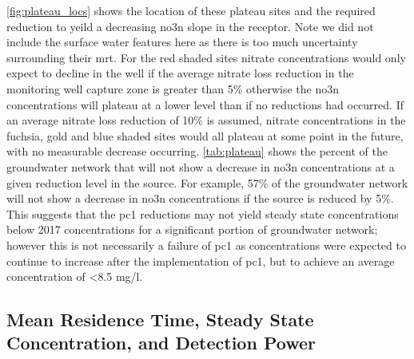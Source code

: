 \autoref{fig:plateau_locs} shows the location of these plateau sites and the required reduction to yeild a decreasing \gls{no3n} slope in the receptor.
Note we did not include the surface water features here as there is too much uncertainty surrounding their \gls{mrt}.
For the red shaded sites nitrate concentrations would only expect to decline in the well if the average nitrate loss reduction in the monitoring well capture zone is greater than 5\% otherwise the \gls{no3n} concentrations will plateau at a lower level than if no reductions had occurred.
If an average nitrate loss reduction of 10\% is assumed, nitrate concentrations in the fuchsia, gold and blue shaded sites would all plateau at some point in the future, with no measurable decrease occurring.
\autoref{tab:plateau} shows the percent of the groundwater network that will not show a decrease in \gls{no3n} concentrations at a given reduction level in the source.
For example, 57\% of the groundwater network will not show a decrease in \gls{no3n} concentrations if the source is reduced by 5\%.
This suggests that the \gls{pc1} reductions may not yield steady state concentrations below 2017 concentrations for a significant portion of groundwater network; however this is not necessarily a failure of \gls{pc1} as concentrations were expected to continue to increase after the implementation of \gls{pc1}, but to achieve an average concentration of <8.5 mg/l.


\begin{landscape}
\end{landscape}

\subsection[Mean Residence Time Impacts]{Mean Residence Time, Steady State Concentration, and Detection Power} \label{sec:mrt_results}

